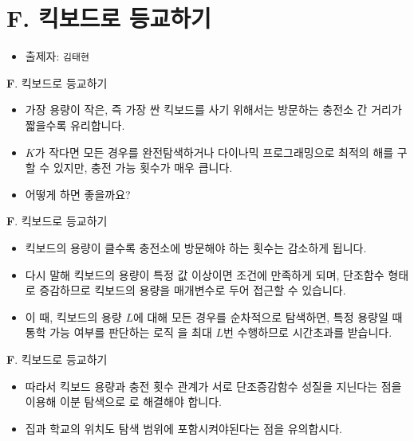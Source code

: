 \section{F. 킥보드로 등교하기}

\begin{frame} %
    \begin{itemize}
        \item 출제자: \texttt{김태현}
    \end{itemize}
\end{frame}

\begin{frame}{\textbf{F}. 킥보드로 등교하기}
    \begin{itemize}
        \item 가장 용량이 작은, 즉 가장 싼 킥보드를 사기 위해서는 방문하는 충전소 간 거리가 짧을수록 유리합니다. 
        \item $K$가 작다면 모든 경우를 완전탐색하거나 다이나믹 프로그래밍으로 최적의 해를 구할 수 있지만, 충전 가능 횟수가 매우 큽니다.
        \item 어떻게 하면 좋을까요?
    \end{itemize}
\end{frame}

\begin{frame}{\textbf{F}. 킥보드로 등교하기}
    \begin{itemize}
        \item 킥보드의 용량이 클수록 충전소에 방문해야 하는 횟수는 감소하게 됩니다. 
        \item 다시 말해 킥보드의 용량이 특정 값 이상이면 조건에 만족하게 되며, 단조함수 형태로 증감하므로 킥보드의 용량을 매개변수로 두어 접근할 수 있습니다.
        \item 이 때, 킥보드의 용량 $L$에 대해 모든 경우를 순차적으로 탐색하면, 특정 용량일 때 통학 가능 여부를 판단하는 로직 을 최대 $L$번 수행하므로 시간초과를 받습니다.
    \end{itemize}
\end{frame}

\begin{frame}{\textbf{F}. 킥보드로 등교하기}
    \begin{itemize}
        \item 따라서 킥보드 용량과 충전 횟수 관계가 서로 단조증감함수 성질을 지닌다는 점을 이용해 이분 탐색으로 로 해결해야 합니다.
        \item 집과 학교의 위치도 탐색 범위에 포함시켜야된다는 점을 유의합시다.
    \end{itemize}
\end{frame}
